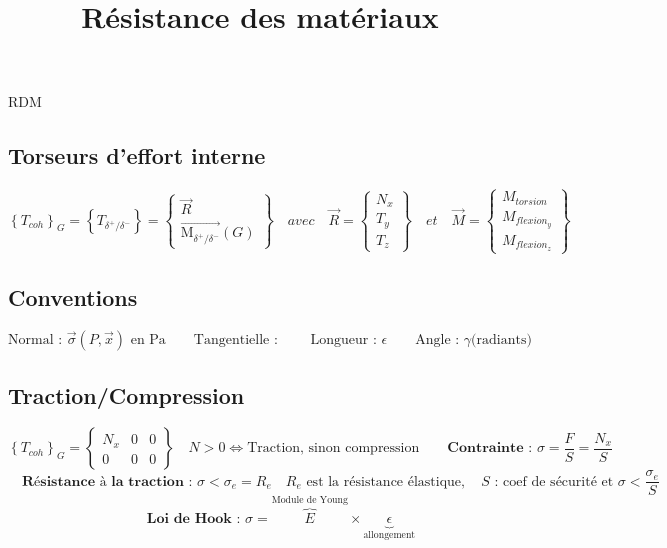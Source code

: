 \documentclass[12pt]{article}
\title{Résistance des matériaux}
\begin{document}
	\begin{center}
		\huge{RDM}
	\end{center}
	\subsection*{Torseurs d'effort interne}
	$$ \left\lbrace T_{coh}\right\rbrace _G=\left\lbrace T_{\delta^+/\delta^-}\right\rbrace=\left\lbrace\begin{array}{c}
		\overrightarrow{R}\\ \overrightarrow{\textrm{M}_{\delta^+/\delta^-}}(G)
		\end{array}\right\rbrace \quad  avec \quad \overrightarrow{R} = \left\lbrace \begin{array}{c}
	N_x \\ T_y \\ T_z
	\end{array} \right\rbrace \quad et \quad \overrightarrow{M} = \left\lbrace \begin{array}{c}
	M_{torsion} \\ M_{flexion_y} \\  M_{flexion_z}
	\end{array} \right\rbrace $$
	\subsection*{Conventions}
	$$ \text{Normal : } \vec{\sigma}(P,\vec{x}) \text{ en Pa} \qquad \text{Tangentielle : } \qquad \text{Longueur : } \epsilon \qquad \text{Angle : } \gamma \text{(radiants)} $$
	\subsection*{Traction/Compression}
	$$ \left\lbrace T_{coh}\right\rbrace_G = \left\lbrace \begin{array}{ccc}
	N_x & 0 & 0\\ 0& 0& 0
	\end{array} \right\rbrace \quad N>0 \Leftrightarrow \text{Traction, sinon compression}
	\qquad
	\textbf{Contrainte : } \sigma = \dfrac{F}{S}=\dfrac{N_x}{S} $$
	$$
	 \quad \textbf{Résistance à la traction : } \sigma<\sigma_e=R_e \quad R_e \text{ est la résistance élastique}, \quad 
	 S \text{ : coef de sécurité et } \sigma < \frac{\sigma_e}{S} $$
	$$  \qquad\quad \textbf{Loi de Hook : } \sigma = \overbrace{E}^\text{Module de Young}\times\underbrace{\epsilon}_\text{allongement}$$
	
\end{document}
